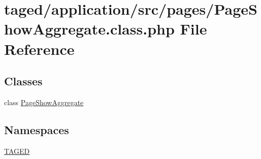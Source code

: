 \hypertarget{_page_show_aggregate_8class_8php}{}\section{taged/application/src/pages/\+Page\+Show\+Aggregate.class.\+php File Reference}
\label{_page_show_aggregate_8class_8php}
\subsection*{Classes}
\begin{DoxyCompactItemize}
\item 
class \hyperlink{class_page_show_aggregate}{Page\+Show\+Aggregate}
\end{DoxyCompactItemize}
\subsection*{Namespaces}
\begin{DoxyCompactItemize}
\item 
 \hyperlink{namespace_t_a_g_e_d}{T\+A\+G\+ED}
\end{DoxyCompactItemize}
